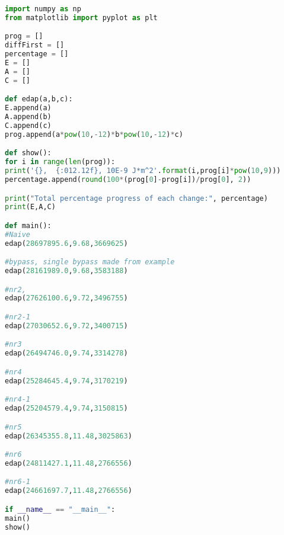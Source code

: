 \documentclass[10pt]{IEEEtran}
\begin{document}
\begin{lstlisting}[basicstyle=\tiny,language=python,caption={Start the 6lbr service and check the status}]
import numpy as np
from matplotlib import pyplot as plt

prog = []
diffFirst = []
percentage = []
E = []
A = []
C = []

def edap(a,b,c):
E.append(a)
A.append(b)
C.append(c)
prog.append(a*pow(10,-12)*b*pow(10,-12)*c)

def show():
for i in range(len(prog)):
print('{},  {:012.12f}, 10E-9 J*m^2'.format(i,prog[i]*pow(10,9)))
percentage.append(round(100*(prog[0]-prog[i])/prog[0], 2))

print("Total percentage progress of each change:", percentage)
print(E,A,C)

def main():
#Naive
edap(28697895.6,9.68,3669625)

#bypass, single bypass made from example
edap(28161989.0,9.68,3583188)

#nr2,
edap(27626100.6,9.72,3496755)

#nr2-1
edap(27030652.6,9.72,3400715)

#nr3 
edap(26494746.0,9.74,3314278)

#nr4 
edap(25284645.4,9.74,3170219)

#nr4-1
edap(25204579.4,9.74,3150815)

#nr5 
edap(26345355.8,11.48,3025863)

#nr6 
edap(24811427.1,11.48,2766556)

#nr6-1 
edap(24661697.7,11.48,2766556)	

if __name__ == "__main__":
main()
show()
\end{lstlisting}
\end{document}
